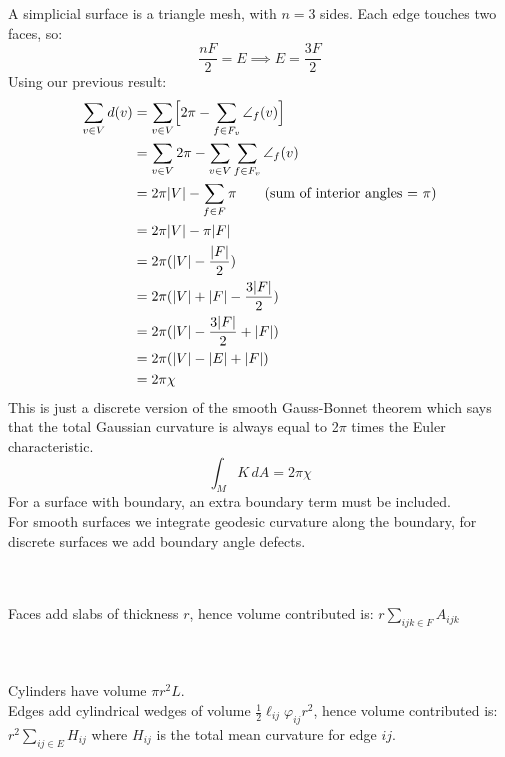 \documentclass{article}
\newcommand\ifrac[2]{{\displaystyle\frac{#1}{#2}}}
\def\hal{\ifrac{1}{2}}
\begin{document}
\vspace{1.8cm}
\\\\


A simplicial surface is a triangle mesh, with $n=3$ sides.
Each edge touches two faces, so:
$$\ifrac{nF}{2} = E \implies E = \ifrac{3F}{2}$$
Using our previous result:
\begin{align*}
    \sum_{v \in V} d(v) &= \sum_{v \in V} \Bigl[ 2\pi - \sum_{f \in F_v} \angle_f(v) \Bigr] \\
        &= \sum_{v \in V} 2\pi - \sum_{v \in V} \sum_{f \in F_v} \angle_f(v) \\
        &= 2\pi|V| - \sum_{f \in F} \pi \tag*{\text{(sum of interior angles = $\pi$)}} \\
        &= 2\pi|V| - \pi|F| \\
        &= 2\pi(|V| - \frac{|F|}{2}) \\
        &= 2\pi(|V| + |F| - \frac{3|F|}{2}) \\
        &= 2\pi(|V| - \frac{3|F|}{2} + |F|) \\
        &= 2\pi(|V| - |E| + |F|) \\
        &= 2\pi\chi
\end{align*}
This is just a discrete version of the smooth Gauss-Bonnet theorem which says that the total Gaussian curvature
is always equal to 2$\pi$ times the Euler characteristic.
$$
    \int_M K \, dA = 2\pi\chi
$$
For a surface with boundary, an extra boundary term must be included.\\
For smooth surfaces we integrate geodesic curvature along the boundary, for discrete surfaces we add boundary angle defects.


\pagebreak
{}\\\\


Faces add slabs of thickness $r$, hence volume contributed is: $r \sum_{ijk \in F} A_{ijk}$


\vspace{1.8cm}
\\\\

Cylinders have volume $\pi r^2 L$.\\
Edges add cylindrical wedges of volume $\hal \ell_{ij} \varphi_{ij} r^2$, hence volume contributed is:
$r^2  \sum_{ij \in E} H_{ij}$ where $H_{ij}$ is the total mean curvature for edge $ij$.
\end{document}

